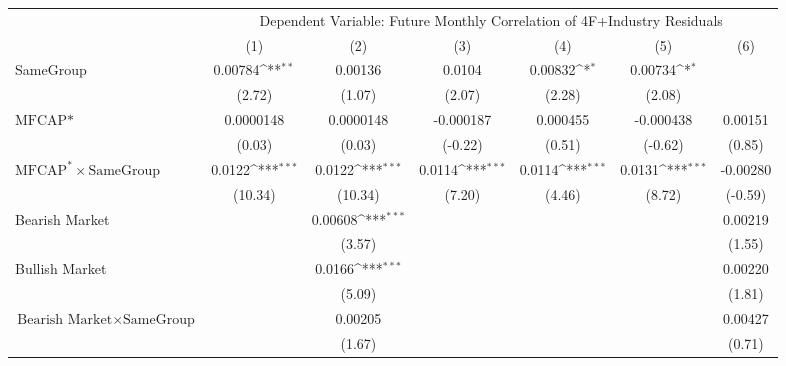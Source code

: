 {
\def\sym#1{\ifmmode^{#1}\else\(^{#1}\)\fi}
\begin{tabular}{l*{6}{c}}
\hline\hline
                &\multicolumn{6}{c}{Dependent Variable: Future Monthly Correlation of 4F+Industry Residuals}                      \\\cmidrule(lr){2-7}
                &\multicolumn{1}{c}{(1)}         &\multicolumn{1}{c}{(2)}         &\multicolumn{1}{c}{(3)}         &\multicolumn{1}{c}{(4)}         &\multicolumn{1}{c}{(5)}         &\multicolumn{1}{c}{(6)}         \\
\hline
SameGroup       &  0.00784\sym{**} &  0.00136         &   0.0104         &  0.00832\sym{*}  &  0.00734\sym{*}  &                  \\
                &   (2.72)         &   (1.07)         &   (2.07)         &   (2.28)         &   (2.08)         &                  \\
[1em]
$ \text{MFCAP*} $&0.0000148         &0.0000148         &-0.000187         & 0.000455         &-0.000438         &  0.00151         \\
                &   (0.03)         &   (0.03)         &  (-0.22)         &   (0.51)         &  (-0.62)         &   (0.85)         \\
[1em]
 $ \text{MFCAP}^* \times {\text{SameGroup} }  $ &   0.0122\sym{***}&   0.0122\sym{***}&   0.0114\sym{***}&   0.0114\sym{***}&   0.0131\sym{***}& -0.00280         \\
                &  (10.34)         &  (10.34)         &   (7.20)         &   (4.46)         &   (8.72)         &  (-0.59)         \\
[1em]
Bearish Market  &                  &  0.00608\sym{***}&                  &                  &                  &  0.00219         \\
                &                  &   (3.57)         &                  &                  &                  &   (1.55)         \\
[1em]
Bullish Market  &                  &   0.0166\sym{***}&                  &                  &                  &  0.00220         \\
                &                  &   (5.09)         &                  &                  &                  &   (1.81)         \\
[1em]
$ {\text{Bearish Market} } \times {\text{SameGroup} }  $ &                  &  0.00205         &                  &                  &                  &  0.00427         \\
                &                  &   (1.67)         &                  &                  &                  &   (0.71)         \\

\end{tabular}}
